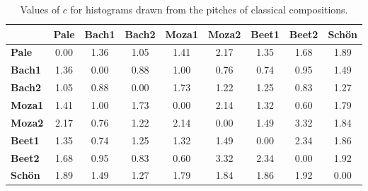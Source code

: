 \begin{table}[h!]
\scriptsize
\begin{center}
\begin{tabular}{| l | c || c | c || c | c || c | c || c |}\hline
 & {\bf Pale} & {\bf Bach1} & {\bf Bach2} & {\bf Moza1} & {\bf Moza2} & {\bf Beet1} & {\bf Beet2} & {\bf Sch\"on} \\\hline
{\bf Pale} & 0.00 & 1.36 & 1.05 & 1.41 & 2.17 & 1.35 & 1.68 & 1.89 \\\hline\hline
{\bf Bach1} & 1.36 & 0.00 & 0.88 & 1.00 & 0.76 & 0.74 & 0.95 & 1.49 \\\hline
{\bf Bach2} & 1.05 & 0.88 & 0.00 & 1.73 & 1.22 & 1.25 & 0.83 & 1.27 \\\hline\hline
{\bf Moza1} & 1.41 & 1.00 & 1.73 & 0.00 & 2.14 & 1.32 & 0.60 & 1.79 \\\hline
{\bf Moza2} & 2.17 & 0.76 & 1.22 & 2.14 & 0.00 & 1.49 & 3.32 & 1.84 \\\hline\hline
{\bf Beet1} & 1.35 & 0.74 & 1.25 & 1.32 & 1.49 & 0.00 & 2.34 & 1.86 \\\hline
{\bf Beet2} & 1.68 & 0.95 & 0.83 & 0.60 & 3.32 & 2.34 & 0.00 & 1.92 \\\hline\hline
{\bf Sch\"on} & 1.89 & 1.49 & 1.27 & 1.79 & 1.84 & 1.86 & 1.92 & 0.00 \\\hline
\end{tabular}
\caption{Values of $c$ for histograms drawn from the pitches of classical compositions.}
\end{center}
\end{table}
